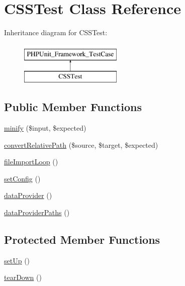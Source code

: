 \hypertarget{classCSSTest}{}\section{C\+S\+S\+Test Class Reference}
\label{classCSSTest}
Inheritance diagram for C\+S\+S\+Test\+:\begin{figure}[H]
\begin{center}
\leavevmode
\includegraphics[height=2.000000cm]{classCSSTest}
\end{center}
\end{figure}
\subsection*{Public Member Functions}
\begin{DoxyCompactItemize}
\item 
\hyperlink{classCSSTest_af29b8a6322bc4355b62e088e11c447b3}{minify} (\$input, \$expected)
\item 
\hyperlink{classCSSTest_af8607abbbdd98d9578e21f0c3cb02dfa}{convert\+Relative\+Path} (\$source, \$target, \$expected)
\item 
\hyperlink{classCSSTest_af7301b8dc02c324aacf67c94fc190a53}{file\+Import\+Loop} ()
\item 
\hyperlink{classCSSTest_a1bcfbc83fe3c2a85e1fc27f610e65f1c}{set\+Config} ()
\item 
\hyperlink{classCSSTest_a6208f2e16f872fe29edf96a4a39b1e08}{data\+Provider} ()
\item 
\hyperlink{classCSSTest_aed56e79de04858ce22b09cd347489498}{data\+Provider\+Paths} ()
\end{DoxyCompactItemize}
\subsection*{Protected Member Functions}
\begin{DoxyCompactItemize}
\item 
\hyperlink{classCSSTest_a2e2b5ecbcca146f5fe5d34c8de1521df}{set\+Up} ()
\item 
\hyperlink{classCSSTest_af3b94f1fd59b66c798148a330e662e6e}{tear\+Down} ()
\end{DoxyCompactItemize}


